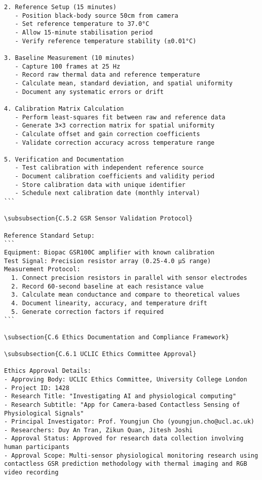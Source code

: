\begin{verbatim}
2. Reference Setup (15 minutes)
   - Position black-body source 50cm from camera
   - Set reference temperature to 37.0°C
   - Allow 15-minute stabilisation period
   - Verify reference temperature stability (±0.01°C)

3. Baseline Measurement (10 minutes)
   - Capture 100 frames at 25 Hz
   - Record raw thermal data and reference temperature
   - Calculate mean, standard deviation, and spatial uniformity
   - Document any systematic errors or drift

4. Calibration Matrix Calculation
   - Perform least-squares fit between raw and reference data
   - Generate 3×3 correction matrix for spatial uniformity
   - Calculate offset and gain correction coefficients
   - Validate correction accuracy across temperature range

5. Verification and Documentation
   - Test calibration with independent reference source
   - Document calibration coefficients and validity period
   - Store calibration data with unique identifier
   - Schedule next calibration date (monthly interval)
```

\subsubsection{C.5.2 GSR Sensor Validation Protocol}

Reference Standard Setup:
```
Equipment: Biopac GSR100C amplifier with known calibration
Test Signal: Precision resistor array (0.25-4.0 μS range)
Measurement Protocol:
  1. Connect precision resistors in parallel with sensor electrodes
  2. Record 60-second baseline at each resistance value
  3. Calculate mean conductance and compare to theoretical values
  4. Document linearity, accuracy, and temperature drift
  5. Generate correction factors if required
```

\subsection{C.6 Ethics Documentation and Compliance Framework}

\subsubsection{C.6.1 UCLIC Ethics Committee Approval}

Ethics Approval Details:
- Approving Body: UCLIC Ethics Committee, University College London
- Project ID: 1428
- Research Title: "Investigating AI and physiological computing"
- Research Subtitle: "App for Camera-based Contactless Sensing of Physiological Signals"
- Principal Investigator: Prof. Youngjun Cho (youngjun.cho@ucl.ac.uk)
- Researchers: Duy An Tran, Zikun Quan, Jitesh Joshi
- Approval Status: Approved for research data collection involving human participants
- Approval Scope: Multi-sensor physiological monitoring research using contactless GSR prediction methodology with thermal imaging and RGB video recording


\end{verbatim}
